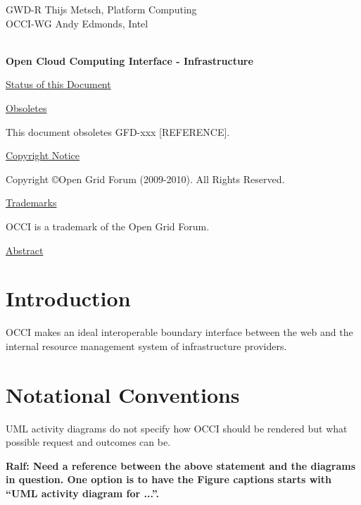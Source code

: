 \documentclass[10pt,a4paper]{article}
\begin{document}
\thispagestyle{empty}

GWD-R \hfill  Thijs Metsch, Platform Computing\\
OCCI-WG \hfill  Andy Edmonds, Intel\\
\\

\vspace*{0.5in}

\begin{Large}
\textbf{Open Cloud Computing Interface - Infrastructure}
\end{Large}

\vspace*{0.5in}

\underline{Status of this Document}



\underline{Obsoletes}

This document obsoletes GFD-xxx [REFERENCE].

\underline{Copyright Notice}

Copyright \copyright Open Grid Forum (2009-2010). All Rights Reserved.

\underline{Trademarks}

OCCI is a trademark of the Open Grid Forum.

\underline{Abstract}



\newpage
\tableofcontents
\newpage

\section{Introduction}


OCCI makes an ideal interoperable boundary interface between the web and the
internal resource management system of infrastructure providers.

\section{Notational Conventions}


UML activity diagrams do not specify how OCCI should be rendered but what
possible request and outcomes can be.

{\bf Ralf: Need a reference between the above statement and the diagrams in question. One option is to have the Figure captions starts with ``UML activity diagram for ...''.}
\end{document}
